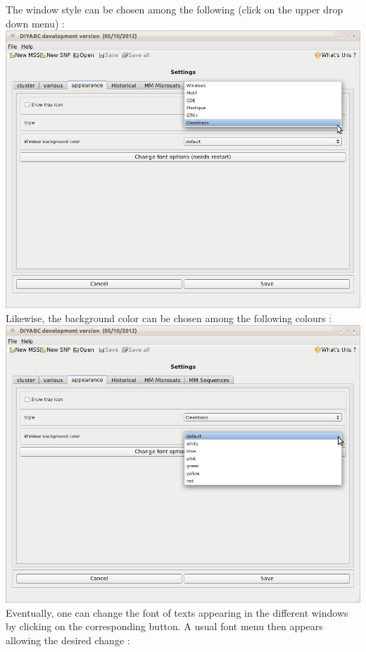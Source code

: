 The window style can be chosen among the following (click on the upper drop down menu) :\\

\includegraphics[scale=0.33]{gui_pictures/Capture-DIYABC-99.png} \\

Likewise, the background color can be chosen among the following colours :\\

\includegraphics[scale=0.33]{gui_pictures/Capture-DIYABC-100.png} \\

Eventually, one can change the font of texts appearing in the different windows by clicking on the corresponding button. A usual font menu then appears allowing the desired change :\\

